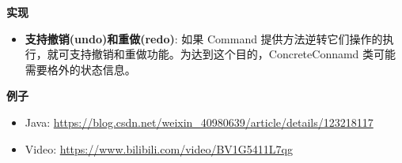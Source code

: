 \noindent\textbf{实现}

\begin{itemize}
    \item \textbf{支持撤销(undo)和重做(redo)}: 如果 Command 提供方法逆转它们操作的执行，就可支持撤销和重做功能。为达到这个目的，ConcreteConnamd 类可能需要格外的状态信息。 
\end{itemize}

\noindent\textbf{例子}

\begin{itemize}
    \item Java: \url{https://blog.csdn.net/weixin_40980639/article/details/123218117}
    \item Video: \url{https://www.bilibili.com/video/BV1G5411L7qg}
\end{itemize}



\newpage